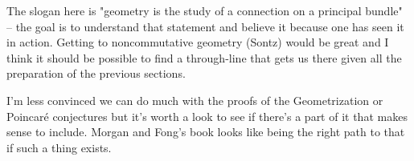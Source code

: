 \documentclass[article]{article}
\begin{document}
The slogan here is "geometry is the study of a connection on a principal bundle" -- the goal is to understand that statement and believe it because one has seen it in action. Getting to noncommutative geometry (Sontz) would be great and I think it should be possible to find a through-line that gets us there given all the preparation of the previous sections. 

I'm less convinced we can do much with the proofs of the Geometrization or Poincar\'e conjectures but it's worth a look to see if there's a part of it that makes sense to include. Morgan and Fong's book looks like being the right path to that if such a thing exists.
\end{document}

